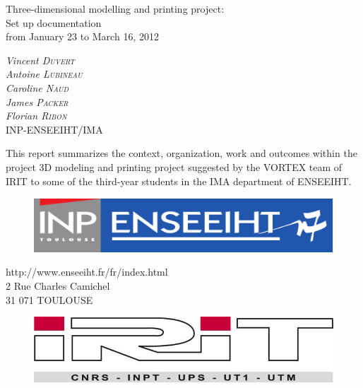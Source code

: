 \documentclass{article}
\begin{document}
\bigskip
\bigskip
\bigskip
\bigskip
\bigskip
\bigskip
\bigskip
\bigskip

\begin{center}
	\LARGE{Three-dimensional modelling and printing project:\\Set up documentation\\}
	\bigskip
	\bigskip
	\Large{from January 23 to March 16, 2012}
\end{center}

\bigskip
\bigskip

\begin{center}
\large{
\textit{Vincent \textsc{Duvert} \\
Antoine \textsc{Lubineau} \\
Caroline \textsc{Naud} \\
James \textsc{Packer} \\
Florian \textsc{Ribon}} \\
\bigskip
INP-ENSEEIHT/IMA 
}
\end{center}

\bigskip
\bigskip

	This report summarizes the context, organization, work and outcomes within the project 3D modeling and printing project suggested by the VORTEX team of IRIT to some of the third-year students in the IMA department of ENSEEIHT.

\bigskip
\bigskip

\begin{figure}[!h]
\begin{center}
	\includegraphics[scale=0.4]{inp-enseeiht}
\end{center}
\end{figure}

\bigskip

\begin{center}
http://www.enseeiht.fr/fr/index.html \\
2 Rue Charles Camichel \\
31 071 TOULOUSE
\end{center}

\bigskip

\begin{figure}[!h]
\begin{center}
	\includegraphics[scale=0.4]{irit}
\end{center}
\end{figure}
\end{document}
